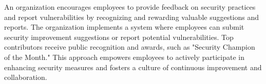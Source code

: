 An organization encourages employees to provide feedback on security practices and report vulnerabilities by recognizing and rewarding valuable suggestions and reports. The organization implements a system where employees can submit security improvement suggestions or report potential vulnerabilities. Top contributors receive public recognition and awards, such as "Security Champion of the Month." This approach empowers employees to actively participate in enhancing security measures and fosters a culture of continuous improvement and collaboration.